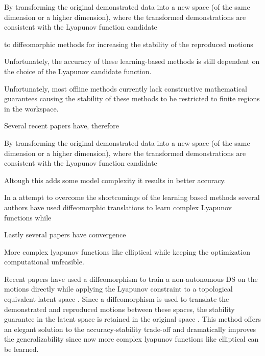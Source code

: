 By transforming the original demonstrated data into a new space (of the same dimension or a higher dimension), where the transformed demonstrations are
consistent with the Lyapunov function candidate




to diffeomorphic methods for increasing the stability of the reproduced motions 


Unfortunately, the accuracy of these learning-based methods is still dependent on the choice of the Lyapunov candidate function. 

Unfortunately, most offline methods currently lack constructive mathematical guarantees causing the stability of these methods to be restricted to finite regions in the workspace.

 Several recent papers have, therefore 


By transforming the original demonstrated data into a new space (of the same dimension or a higher dimension), where the transformed demonstrations are
consistent with the Lyapunov function candidate


Altough this adds some model complexity it results in better accuracy.

In a attempt to overcome the shortcomings of the learning based methods several authors have used diffeomorphic translations to learn complex Lyapunov functions while

Lastly several papers have convergence

More complex lyapunov functions like elliptical while keeping the optimization computational unfeasible.



Recent papers have used a diffeomorphism to train a non-autonomous DS on the motions directly while applying the Lyapunov constraint to a topological equivalent latent space \cite{neumannLearningRobotMotions2015,perrinFastDiffeomorphicMatching2016,jinImprovedLearningAccuracy2019,ranaEuclideanizingFlowsDiffeomorphic2020,urainImitationFlowLearningDeep2020,saverianoLearningStableRobotic2022,urainLearningStableVector2022,wangLearningDeepRobotic2022}. Since a diffeomorphism is used to translate the demonstrated and reproduced motions between these spaces, the stability guarantee in the latent space is retained in the original space \cite{leeIntroductionTopologicalManifolds2011,leeIntroductionSmoothManifolds2012,leeIntroductionRiemannianManifolds2018}. This method offers an elegant solution to the accuracy-stability trade-off and dramatically improves the generalizability since now more complex lyapunov functions like elliptical can be learned. 


